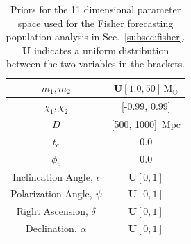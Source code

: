 \documentclass[twocolumn]{aastex631}
\begin{document}

\begin{table}[t]
    \centering
    \begin{tabular}{c|c}
    \hline\hline
    $m_1, m_2$ & $\boldsymbol{U}[1.0, 50]\, \mathrm{M}_\odot$ \\ \hline
    $\chi_1, \chi_2$ & [-0.99, 0.99] \\ \hline
    $D$ & [500, 1000]\, Mpc \\ \hline
    $t_c$ & 0.0 \\ \hline
    $\phi_c$ & 0.0 \\ \hline
    Inclincation Angle, $\iota$ & $\boldsymbol{U}[0, 1]$ \\ \hline
    Polarization Angle, $\psi$ & $\boldsymbol{U}[0, 1]$ \\ \hline
    Right Ascension, $\delta$ & $\boldsymbol{U}[0, 1]$ \\ \hline
    Declination, $\alpha$ & $\boldsymbol{U}[0, 1]$ \\ 
    \hline\hline
    \end{tabular}
    \caption{Priors for the 11 dimensional parameter space used for the Fisher forecasting population analysis in Sec.~\ref{subsec:fisher}. 
    $\boldsymbol{U}$ indicates a uniform distribution between the two variables in the brackets.}
    \label{tab:priors}
\end{table}
\end{document}
